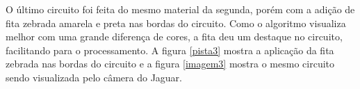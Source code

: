 	\begin{figure}[H]
		\centering
\end{figure}

O último circuito foi feita do mesmo material da segunda, porém com a adição de fita zebrada amarela e preta nas bordas do circuito. Como o algoritmo visualiza melhor com uma grande diferença de cores, a fita deu um destaque no circuito, facilitando para o processamento. A figura \ref{pista3} mostra a aplicação da fita zebrada nas bordas do circuito e a figura \ref{imagem3} mostra o mesmo circuito sendo visualizada pelo câmera do Jaguar.

	\begin{figure}[H]
		\centering
\end{figure}


